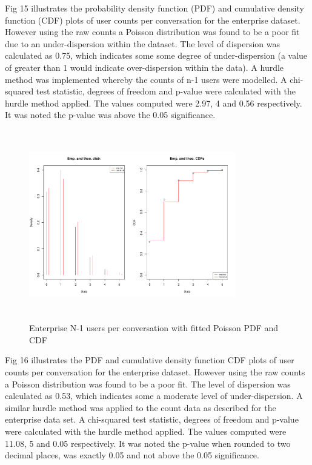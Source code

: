 \documentclass[conference]{IEEEtran}
\begin{document}
Fig 15 illustrates the probability density function (PDF) and cumulative density function (CDF) plots of user counts per conversation for the enterprise dataset. However using the raw counts a Poisson distribution was found to be a poor fit due to an under-dispersion within the dataset. The level of dispersion was calculated as 0.75, which indicates some some degree of under-dispersion (a value of greater than 1 would indicate over-dispersion within the data). A hurdle method was implemented whereby the counts of n-1 users were modelled. A chi-squared test statistic, degrees of freedom and p-value were calculated with the hurdle method applied. The values computed were 2.97, 4 and 0.56 respectively. It was noted the p-value was above the 0.05 significance.


\begin{figure}
\begin{center}
\includegraphics[height=8.3cm, width=9cm]{15_users_enterprise.pdf} 
\caption{Enterprise N-1 users per conversation with fitted Poisson PDF and CDF}
\end{center}
\label{fig:interarrival_ent}
\end{figure}

Fig 16 illustrates the PDF and cumulative density function CDF  plots of user counts per conversation for the enterprise dataset. However using the raw counts a Poisson distribution was found to be a poor fit. The level of dispersion was calculated as 0.53, which indicates some a moderate level of under-dispersion. A similar hurdle method was applied to the count data as described for the enterprise data set. A chi-squared test statistic, degrees of freedom and p-value were calculated with the hurdle method applied. The values computed were 11.08, 5 and 0.05 respectively. It was noted the p-value when rounded to two decimal places, was exactly 0.05 and not above the 0.05 significance.
\end{document}
